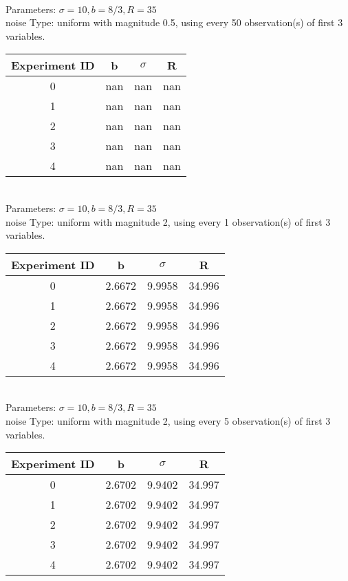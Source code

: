 \begin{multicols}{3}
\begin{tabular}{cccc}
 \end{tabular}\\
Parameters: $\sigma=10, b=8/3, R=35$\\
noise Type: uniform with magnitude 0.5, using every 50 observation(s) of first 3 variables.\\
\begin{tabular}{cccc}
\hline Experiment ID & b & $\sigma$ & R \\ \hline 
0 & nan & nan & nan\\ \hline 
 1 & nan & nan & nan\\ \hline 
 2 & nan & nan & nan\\ \hline 
 3 & nan & nan & nan\\ \hline 
 4 & nan & nan & nan\\ \hline 
 \end{tabular}\\
Parameters: $\sigma=10, b=8/3, R=35$\\
noise Type: uniform with magnitude 2, using every 1 observation(s) of first 3 variables.\\
\begin{tabular}{cccc}
\hline Experiment ID & b & $\sigma$ & R \\ \hline 
0 & 2.6672 & 9.9958 & 34.996\\ \hline 
 1 & 2.6672 & 9.9958 & 34.996\\ \hline 
 2 & 2.6672 & 9.9958 & 34.996\\ \hline 
 3 & 2.6672 & 9.9958 & 34.996\\ \hline 
 4 & 2.6672 & 9.9958 & 34.996\\ \hline 
 \end{tabular}\\
Parameters: $\sigma=10, b=8/3, R=35$\\
noise Type: uniform with magnitude 2, using every 5 observation(s) of first 3 variables.\\
\begin{tabular}{cccc}
\hline Experiment ID & b & $\sigma$ & R \\ \hline 
0 & 2.6702 & 9.9402 & 34.997\\ \hline 
 1 & 2.6702 & 9.9402 & 34.997\\ \hline 
 2 & 2.6702 & 9.9402 & 34.997\\ \hline 
 3 & 2.6702 & 9.9402 & 34.997\\ \hline 
 4 & 2.6702 & 9.9402 & 34.997\\ \hline 
 \end{tabular}\\

\end{multicols}
